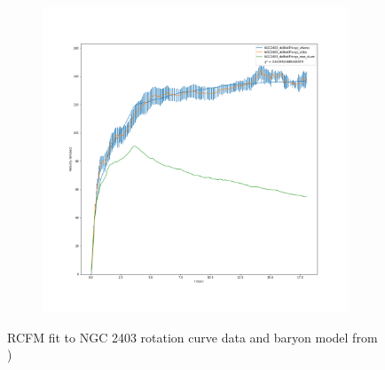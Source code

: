 \documentclass[reprint,%
 amsmath,amssymb,
 aps,
]{revtex4-1}
\begin{document}
 
   \begin{figure}[h!] 
    \begin{subfigure}[c]{0.95\linewidth}
    \centering
    \includegraphics[width=0.95\linewidth]{figures/NGC2403_deBlokThings_XueSofue}
  \end{subfigure}%
  \caption{ RCFM fit to  NGC 2403  rotation curve data and   baryon model from  \citet{Blok1})}  \label{fig:NGC2403RCFM} 
\end{figure}
\end{document}

